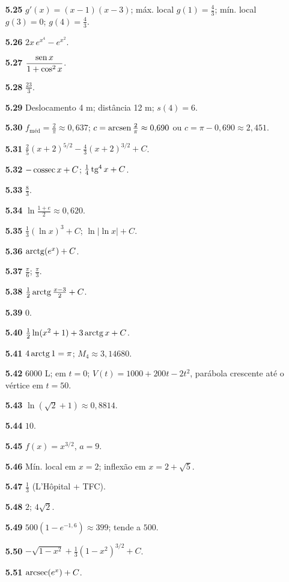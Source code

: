 {\begin{multicols}{2}
\begin{itemize}[leftmargin=2.7em,labelsep=0.5em,itemsep=1pt]
\item[\textbf{5.25}] $g'(x)=(x-1)(x-3)$; máx. local $g(1)=\tfrac43$; mín. local $g(3)=0$; $g(4)=\tfrac43$.
\item[\textbf{5.26}] $2x\,e^{x^4}-e^{x^2}$.
\item[\textbf{5.27}] $\dfrac{\operatorname{sen} x}{1+\cos^2x}$.
\item[\textbf{5.28}] $\tfrac{23}3$.
\item[\textbf{5.29}] Deslocamento 4 m; distância 12 m; $s(4)=6$.
\item[\textbf{5.30}] $f_{\text{méd}}=\tfrac2\pi\approx0{,}637$; $c=\operatorname{arcsen}\tfrac2\pi\approx0{,}690$ ou $c=\pi-0{,}690\approx2{,}451$.
\item[\textbf{5.31}] $\tfrac25(x+2)^{5/2}-\tfrac43(x+2)^{3/2}+C$.
\item[\textbf{5.32}] $-\operatorname{cossec} x+C$; $\tfrac14\operatorname{tg}^4x+C$.
\item[\textbf{5.33}] $\tfrac83$.
\item[\textbf{5.34}] $\ln\tfrac{1+e}2\approx0{,}620$.
\item[\textbf{5.35}] $\tfrac13(\ln x)^3+C$; $\ln|\ln x|+C$.
\item[\textbf{5.36}] $\operatorname{arctg}(e^x)+C$.
\item[\textbf{5.37}] $\tfrac\pi6$; $\tfrac\pi3$.
\item[\textbf{5.38}] $\tfrac12\operatorname{arctg}\tfrac{x-3}2+C$.
\item[\textbf{5.39}] $0$.
\item[\textbf{5.40}] $\tfrac12\ln(x^2+1)+3\operatorname{arctg} x+C$.
\item[\textbf{5.41}] $4\operatorname{arctg}1=\pi$; $M_4\approx3{,}14680$.
\item[\textbf{5.42}] $6000$ L; em $t=0$; $V(t)=1000+200t-2t^2$, parábola crescente até o vértice em $t=50$.
\item[\textbf{5.43}] $\ln(\sqrt2+1)\approx0{,}8814$.
\item[\textbf{5.44}] $10$.
\item[\textbf{5.45}] $f(x)=x^{3/2}$, $a=9$.
\item[\textbf{5.46}] Mín. local em $x=2$; inflexão em $x=2+\sqrt5$.
\item[\textbf{5.47}] $\tfrac13$ (L'Hôpital + TFC).
\item[\textbf{5.48}] $2$; $4\sqrt2$.
\item[\textbf{5.49}] $500(1-e^{-1{,}6})\approx399$; tende a $500$.
\item[\textbf{5.50}] $-\sqrt{1-x^2}+\tfrac13(1-x^2)^{3/2}+C$.
\item[\textbf{5.51}] $\operatorname{arcsec}(e^x)+C$.

\end{itemize}
\end{multicols}}
